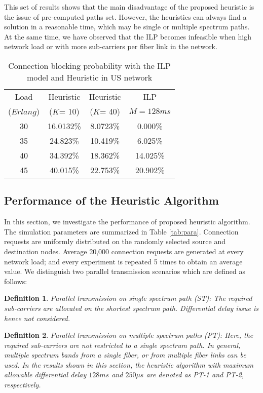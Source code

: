 \documentclass[conference]{IEEEtran}
\newtheorem{definition}{Definition}
\begin{document}
\par This set of results shows that the main disadvantage of the proposed heuristic is the issue of pre-computed paths set. However, the heuristics can always find a solution in a reasonable time, which may be single or multiple spectrum paths. At the same time,  we have observed that the ILP becomes infeasible  when high network load or with more sub-carriers per fiber link in the network.
     
\begin{table}
\centering
   \caption{Connection blocking probability with the ILP model and Heuristic in US network } \label{tab:block-ilp}
\begin{tabular}{ | c | c | c | c |}
        \hline
         Load   & Heuristic &   Heuristic   & ILP \\
         ($Erlang$) & ($K$= 10) & ($K$= 40)  & $M=128ms$ \\ \hline
  30&        16.0132\% &	8.0723\% &	0.000\% \\ \hline
35&	24.823\%	&10.419\%	&6.025\%\\ \hline
	40&34.392\%&	18.362\%	&14.025\%\\ \hline
	45& 40.015\%&	22.753\%	&20.902\%\\ \hline              
        \end{tabular}
\end{table}


 \subsection{Performance of the Heuristic Algorithm} \label{large}
 In this section, we investigate the performance of  proposed heuristic algorithm. The simulation 
 parameters are summarized in Table \ref{tab:para}. Connection requests are uniformly distributed on the randomly selected source and destination nodes. Average 20,000 connection requests are generated at every network load; and  every experiment is repeated  5 times to obtain an average value.   We distinguish  two parallel transmission scenarios which are defined as follows:
 \begin{definition}
 \emph{Parallel transmission on single spectrum path (ST)}: The required sub-carriers are allocated on the  shortest spectrum path.  Differential delay issue is hence not considered.    
 \end{definition}
 \begin{definition}
 \emph{Parallel transmission on multiple spectrum paths (PT)}: Here, the required sub-carriers are not restricted to a single spectrum path. In general, multiple spectrum bands from a single fiber, or from multiple fiber links can be used. In the results shown in this section, the heuristic algorithm with maximum allowable differential delay $128ms$ and $250\mu s$ are denoted as PT-1 and PT-2, respectively. 
 \end{definition}
 
\end{document}
